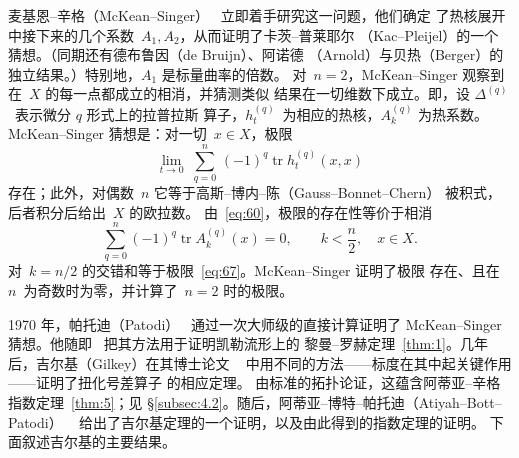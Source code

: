 \documentclass[11pt]{amsart}
\theoremstyle{definition}
\theoremstyle{remark}
\theoremstyle{plain}
\numberwithin{equation}{section}
\renewcommand{\:}{\colon}
\DeclareMathOperator{\Trs}{Tr\mstrut _s}
\DeclareMathOperator{\Tr}{Tr}
\DeclareMathOperator{\tr}{tr}
\DeclareRobustCommand{\mstrut}{^{\vphantom{1*\prime y\vee M}}}
\DeclareMathOperator{\Euler}{Euler}
\newcommand{\q}{^{(q)}}
\begin{document}
麦基恩–辛格（McKean–Singer）~\cite{MS} 立即着手研究这一问题，他们确定
了热核展开中接下来的几个系数~$A_1,A_2$，从而证明了卡茨–普莱耶尔
（Kac–Pleijel）的一个猜想。（同期还有德布鲁因（de Bruijn）、阿诺德
（Arnold）与贝热（Berger）的独立结果。）特别地，$A_1$ 是标量曲率的倍数。
对~$n=2$，McKean–Singer 观察到在~$X$ 的每一点都成立的相消，并猜测类似
结果在一切维数下成立。即，设 $\Delta \q$~表示微分 $q$ 形式上的拉普拉斯
算子，$h_t\q$~为相应的热核，$A_k\q$ 为热系数。
McKean–Singer 猜想是：对一切~$x\in X$，极限
  \begin{equation}\label{eq:67}
     \lim\limits_{t\to0}\;\sum\limits_{q=0}^n\,(-1)^q\tr h_t\q(x,x) 
  \end{equation}
存在；此外，对偶数~$n$ 它等于高斯–博内–陈（Gauss–Bonnet–Chern）
被积式，后者积分后给出~$X$ 的欧拉数。
由~\eqref{eq:60}，极限的存在性等价于相消
  \begin{equation}\label{eq:68}
     \sum\limits_{q=0}^n(-1)^q\tr A_k\q(x)=0,\qquad k<\frac n2,\quad x\in
     X. 
  \end{equation}
对~$k=n/2$ 的交错和等于极限~\eqref{eq:67}。McKean–Singer 证明了极限
存在、且在 $n$~为奇数时为零，并计算了~$n=2$ 时的极限。

1970 年，帕托迪（Patodi）~\cite{P1} 通过一次大师级的直接计算证明了
McKean–Singer 猜想。他随即~\cite{P2} 把其方法用于证明凯勒流形上的
黎曼–罗赫定理~\ref{thm:1}。几年后，吉尔基（Gilkey）在其博士论文
~\cite{Gi1} 中用不同的方法——标度在其中起关键作用——证明了扭化号差算子
的相应定理。
由标准的拓扑论证，这蕴含阿蒂亚–辛格指数定理~\ref{thm:5}；见
§\ref{subsec:4.2}。随后，阿蒂亚–博特–帕托迪（Atiyah–Bott–Patodi）
~\cite{ABP} 给出了吉尔基定理的一个证明，以及由此得到的指数定理的证明。
下面叙述吉尔基的主要结果。
\end{document}
